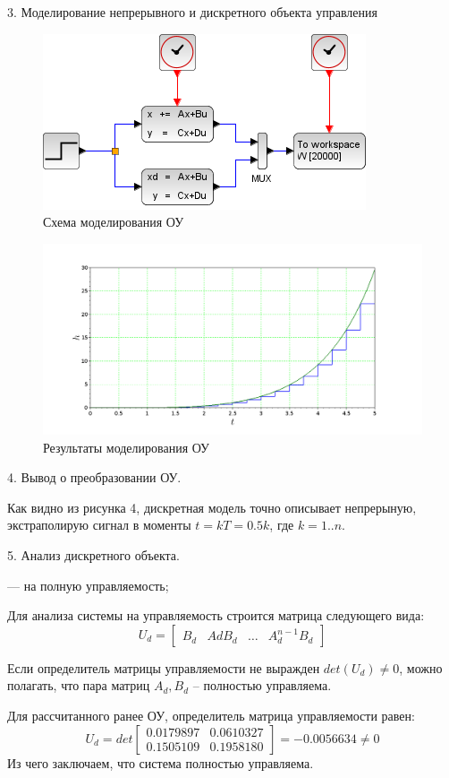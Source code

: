 \documentclass[a4paper,14pt]{extreport}
\begin{document}
3. Моделирование непрерывного и дискретного объекта управления

\begin{figure}[H]
\center\includegraphics[width=0.5\linewidth]{model_1.png}
\caption{Схема моделирования ОУ}
\label{fig:scr1}
\end{figure}

\begin{figure}[H]
	\center\includegraphics[width=0.7\linewidth]{model_1_res.png}
	\caption{Результаты моделирования ОУ}
	\label{fig:scr1}
\end{figure}

4. Вывод о преобразовании ОУ.

Как видно из рисунка 4, дискретная модель точно описывает непрерыную, экстраполирую сигнал в моменты $t = kT = 0.5k$, где $k = 1..n$.

5. Анализ дискретного объекта.

— на полную управляемость;

Для анализа системы на управляемость строится матрица следующего вида:
\begin{equation}
	U_d =
	\begin{bmatrix}
	B_d & Ad B_d & \dots & A_d^{n-1} B_d
	\end{bmatrix}
\end{equation}

Если определитель матрицы управляемости не выражден $det(U_d) \ne 0$, можно полагать, что пара матриц $A_d, B_d$ -- полностью управляема.

Для рассчитанного ранее ОУ, определитель матрица управляемости равен:
\begin{equation}
U_d =det
\begin{bmatrix}
0.0179897    &0.0610327  \\
0.1505109    &0.1958180
\end{bmatrix}
=- 0.0056634  \ne 0
\end{equation}
Из чего заключаем, что система полностью управляема.
\end{document}
